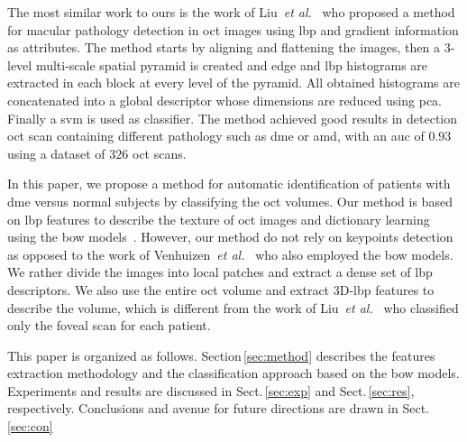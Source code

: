 The most similar work to ours is the work of Liu~\textit{et al.}~\cite{Liu2011} who proposed a method for macular pathology detection in \ac{oct} images using \ac{lbp} and gradient information as attributes.
The method starts by aligning and flattening the images, then a $3$-level multi-scale spatial pyramid is created and edge and \ac{lbp} histograms are extracted in each block at every level of the pyramid. 
All obtained histograms are concatenated into a global descriptor whose dimensions are reduced using \ac{pca}. Finally a \ac{svm} is used as classifier. 
The method achieved good results in detection \ac{oct} scan containing different pathology such as \ac{dme} or \ac{amd}, with an \ac{auc} of $0.93$ using a dataset of $326$ \ac{oct} scans.  

In this paper, we propose a method for automatic identification of patients with \ac{dme} versus normal subjects by classifying the \ac{oct} volumes. Our method is based on \ac{lbp} features to describe the texture of \ac{oct} images and dictionary learning using the \ac{bow} models~\cite{Sivic2003}.
However, our method do not rely on keypoints detection as opposed to the work of Venhuizen~\textit{et al.}~\cite{Venhuizen2015} who also employed the \ac{bow} models. We rather divide the images into local patches and extract a dense set of \ac{lbp} descriptors.
We also use the entire \ac{oct} volume and extract 3D-\ac{lbp} features to describe the volume, which is different from the work of Liu~\textit{et al.}~\cite{Liu2011} who classified only the foveal scan for each patient.

This paper is organized as follows. Section\,\ref{sec:method} describes the features extraction methodology and the classification approach based on the \ac{bow} models. Experiments and results are discussed in Sect.\,\ref{sec:exp} and Sect.\,\ref{sec:res}, respectively. Conclusions and avenue for future directions are drawn in Sect.\,\ref{sec:con}


